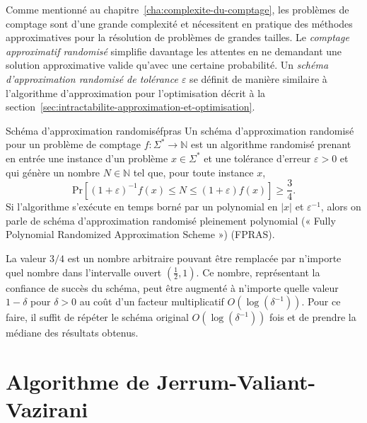 Comme mentionné au chapitre~\ref{cha:complexite-du-comptage}, les problèmes de comptage sont d'une grande complexité et nécessitent en pratique des méthodes approximatives pour la résolution de problèmes de grandes tailles. Le \textit{comptage approximatif randomisé} simplifie davantage les attentes en ne demandant une solution approximative valide qu'avec une certaine probabilité. Un \textit{schéma d'approximation randomisé de tolérance $\varepsilon$} se définit de manière similaire à l'algorithme d'approximation pour l'optimisation décrit à la section~\ref{sec:intractabilite-approximation-et-optimisation}. 

\begin{maindefinition}{Schéma d'approximation randomisé}{fpras}
    Un schéma d'approximation randomisé pour un problème de comptage $f: \Sigma^{*} \to \mathbb{N}$ est un algorithme randomisé prenant en entrée une instance d'un problème $x \in \Sigma^{*}$ et une tolérance d'erreur $\varepsilon > 0$ et qui génère un nombre $N \in \mathbb{N}$ tel que, pour toute instance $x$,
    \begin{equation*}
        \mathrm{ Pr }\left[(1+\varepsilon)^{-1} f(x) \leq N \leq (1+\varepsilon)f(x)\right] \geq \frac{3}{4} .
    \end{equation*}
    Si l'algorithme s'exécute en temps borné par un polynomial en $\lvert x \rvert$ et $\varepsilon^{-1}$, alors on parle de schéma d'approximation randomisé pleinement polynomial (« Fully Polynomial Randomized Approximation Scheme ») (FPRAS).
\end{maindefinition}

La valeur $3/4$ est un nombre arbitraire pouvant être remplacée par n'importe quel nombre dans l'intervalle ouvert $(\frac{1}{2}, 1)$. Ce nombre, représentant la confiance de succès du schéma, peut être augmenté à n'importe quelle valeur $1-\delta$ pour $\delta > 0$ au coût d'un facteur multiplicatif $O(\log(\delta^{-1}))$. Pour ce faire, il suffit de répéter le schéma original $O(\log(\delta^{-1}))$ fois et de prendre la médiane des résultats obtenus.   


\section{Algorithme de Jerrum-Valiant-Vazirani}
\label{sec:algorithme-jvv}

